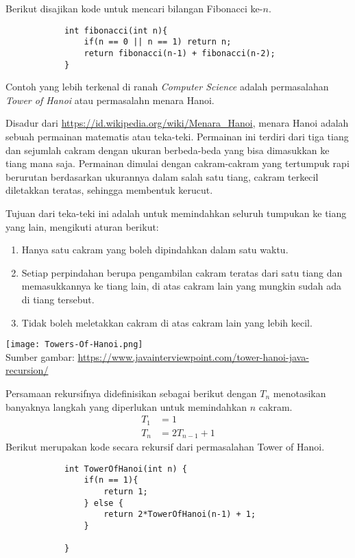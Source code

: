 		    Berikut disajikan kode untuk mencari bilangan Fibonacci ke-$n$.
		    \begin{lstlisting}
		    int fibonacci(int n){
		    	if(n == 0 || n == 1) return n;
		    	return fibonacci(n-1) + fibonacci(n-2);
		    }
		    \end{lstlisting}
		    
		    Contoh yang lebih terkenal di ranah \textit{Computer Science} adalah permasalahan \textit{Tower of Hanoi} atau permasalahn menara Hanoi.
		    \begin{remark*} 
		    Disadur dari \url{https://id.wikipedia.org/wiki/Menara_Hanoi}, 
		    menara Hanoi adalah sebuah permainan matematis atau teka-teki. Permainan ini terdiri dari tiga tiang dan sejumlah cakram dengan ukuran berbeda-beda yang bisa dimasukkan ke tiang mana saja. Permainan dimulai dengan cakram-cakram yang tertumpuk rapi berurutan berdasarkan ukurannya dalam salah satu tiang, cakram terkecil diletakkan teratas, sehingga membentuk kerucut.
		    
		    Tujuan dari teka-teki ini adalah untuk memindahkan seluruh tumpukan ke tiang yang lain, mengikuti aturan berikut:
		    
		    \begin{enumerate}
		    \item Hanya satu cakram yang boleh dipindahkan dalam satu waktu.
		    	    \item Setiap perpindahan berupa pengambilan cakram teratas dari satu tiang dan memasukkannya ke tiang lain, di atas cakram lain yang mungkin sudah ada di tiang tersebut.
		    	    \item Tidak boleh meletakkan cakram di atas cakram lain yang lebih kecil.
		    \end{enumerate}
		    \texttt{[image: Towers-Of-Hanoi.png]}\\
		    Sumber gambar: \url{https://www.javainterviewpoint.com/tower-hanoi-java-recursion/}
		    \end{remark*}
		    Persamaan rekursifnya didefinisikan sebagai berikut dengan $T_n$ menotasikan banyaknya langkah yang diperlukan untuk memindahkan $n$ cakram.
		    \begin{align*}
		        T_1 &= 1 \\
		        T_n &= 2T_{n-1}+1
		    \end{align*}
		    Berikut merupakan kode secara rekursif dari permasalahan Tower of Hanoi.
		    \begin{lstlisting}
		    int TowerOfHanoi(int n) {
		    	if(n == 1){ 
		    		return 1;
		    	} else {
		    		return 2*TowerOfHanoi(n-1) + 1;
		    	}
		    	
		    }
		    \end{lstlisting}
		    
